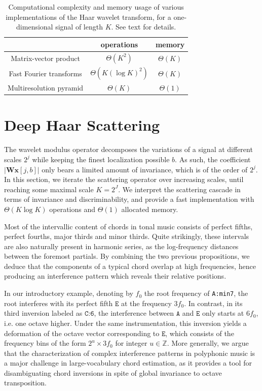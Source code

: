 \documentclass{article}
\makeatletter
\newcommand*{\ie}{i.e.\@\xspace}
\makeatother
\begin{document}
\begin{table}
	\begin{center}
	\begin{tabular}{|c|cc|}
		\hline
		& operations & memory \\
		\hline
		Matrix-vector product & $\Theta(K^2)$ & $\Theta(K)$ \\
		Fast Fourier transforms & $\Theta(K (\log K)^2)$ & $\Theta(K)$ \\
		Multiresolution pyramid & $\Theta(K)$ & $\Theta(1)$ \\
		\hline		
	\end{tabular}
	\end{center}
	\caption{
	Computational complexity and memory usage of various implementations
	of the Haar wavelet transform, for a one-dimensional signal of length $K$.
	See text for details.
	\label{table:wavelet-complexities}}
\end{table}


\section{Deep Haar Scattering}\label{sec:scattering}
The wavelet modulus operator decomposes the variations of a signal at
different scales $2^j$ while keeping the finest localization possible $b$.
As such, the coefficient $\vert \mathbf{W} \boldsymbol{x}[j, b] \vert$
only bears a limited amount of invariance, which is of the order
of $2^j$.
In this section, we iterate the scattering operator over increasing scales,
until reaching some maximal scale $K=2^J$.
We interpret the scattering cascade in terms of invariance and discriminability,
and provide a fast implementation with $\Theta(K \log K)$ operations
and $\Theta(1)$ allocated memory.

Most of the intervallic content of chords in tonal music consists of perfect fifths,
perfect fourths, major thirds and minor thirds.
Quite strikingly, these intervals are also naturally present in harmonic series,
as the log-frequency distances between the foremost partials.
By combining the two previous propositions, we deduce that
the components of a typical chord overlap at high frequencies,
hence producing an interference pattern which reveals their relative positions.

In our introductory example, denoting by $f_0$ the root frequency of \texttt{A:min7},
the root interferes with its perfect fifth $\texttt{E}$ at the frequency $3 f_0$.
In contrast, in its third inversion labeled as $\texttt{C:6}$, the interference
between $\texttt{A}$ and $\texttt{E}$ only starts at $6 f_0$, \ie one octave higher.
Under the same instrumentation, this inversion yields a deformation of the
octave vector corresponding to $\texttt{E}$, which consists of the frequency bins
of the form $2^u \times 3 f_0$ for integer $u \in \mathbb{Z}$.
More generally, we argue that the characterization of complex interference patterns
in polyphonic music is a major challenge in large-vocabulary chord estimation,
as it provides a tool for disambiguating chord inversions in spite of global
invariance to octave transposition.
\end{document}
